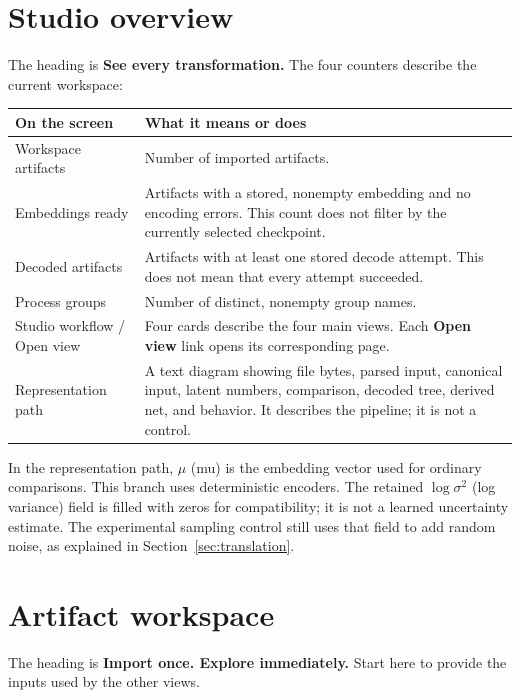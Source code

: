 \documentclass[11pt,a4paper]{article}
\makeatletter
\newcommand{\ui}[1]{\textbf{#1}}
\newenvironment{controls}{%
  \small\begin{longtable}{@{}>{\raggedright\arraybackslash}p{.34\linewidth}
    >{\raggedright\arraybackslash}p{.62\linewidth}@{}}
  \toprule\textbf{On the screen} & \textbf{What it means or does}\\\midrule\endhead
  \bottomrule\endfoot
}{\end{longtable}\normalsize}
\makeatother
\begin{document}
\section{Studio overview}
The heading is \ui{See every transformation.} The four counters describe the
current workspace:

\begin{controls}
Workspace artifacts & Number of imported artifacts.\\
Embeddings ready & Artifacts with a stored, nonempty embedding and no encoding
errors. This count does not filter by the currently selected checkpoint.\\
Decoded artifacts & Artifacts with at least one stored decode attempt. This
does not mean that every attempt succeeded.\\
Process groups & Number of distinct, nonempty group names.\\
Studio workflow / Open view & Four cards describe the four main views. Each
\ui{Open view} link opens its corresponding page.\\
Representation path & A text diagram showing file bytes, parsed input,
canonical input, latent numbers, comparison, decoded tree, derived net, and
behavior. It describes the pipeline; it is not a control.\\
\end{controls}

In the representation path, $\mu$ (mu) is the embedding vector used for
ordinary comparisons. This branch uses deterministic encoders. The retained
$\log\sigma^2$ (log variance) field is filled with zeros for compatibility;
it is not a learned uncertainty estimate. The experimental sampling control
still uses that field to add random noise, as explained in
Section~\ref{sec:translation}.

\section{Artifact workspace}
\label{sec:workspace}
The heading is \ui{Import once. Explore immediately.} Start here to provide
the inputs used by the other views.
\end{document}
